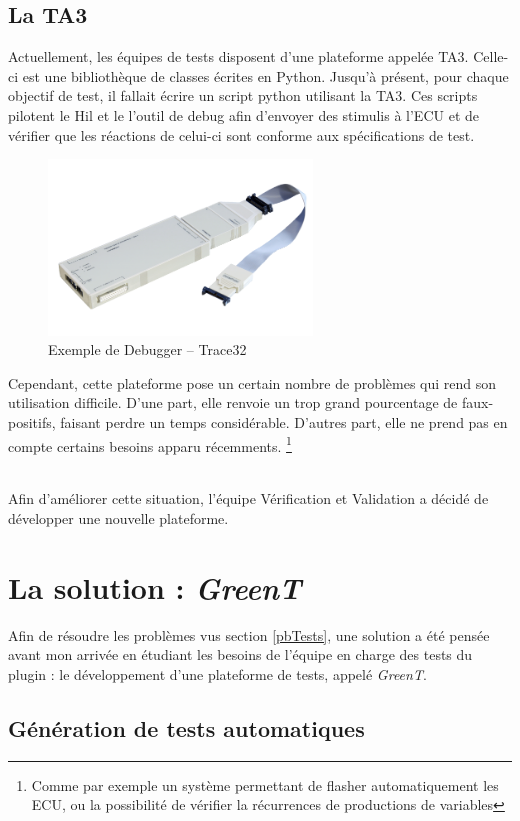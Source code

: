 	\subsection{La TA3}
	Actuellement, les équipes de tests disposent d'une plateforme appelée TA3. Celle-ci est une bibliothèque de classes écrites en Python. Jusqu'à présent, pour chaque objectif de test, il fallait écrire un script python utilisant la TA3. Ces scripts pilotent le Hil et le l'outil de debug afin d'envoyer des stimulis à l'ECU et de vérifier que les réactions de celui-ci sont conforme aux spécifications de test.
	\begin{figure}[H]		
		\centering
		\includegraphics[width=7cm]{contents/images/trace32.png}
		\caption{Exemple de Debugger -- Trace32}
		\label{fig:photoHil}
	\end{figure}

	Cependant, cette plateforme pose un certain nombre de problèmes qui rend son utilisation difficile. D'une part, elle renvoie un trop grand pourcentage de faux-positifs, faisant perdre un temps considérable. D'autres part, elle ne prend pas en compte certains besoins apparu récemments. \footnote{Comme par exemple un système permettant de flasher automatiquement les ECU, ou la possibilité de vérifier la récurrences de productions de variables}
\\~

	Afin d'améliorer cette situation, l'équipe Vérification et Validation a décidé de développer une nouvelle plateforme.

	\section{La solution : \textit{GreenT}}
	Afin de résoudre les problèmes vus section \ref{pbTests}, une solution a été pensée avant mon arrivée en étudiant les besoins de l'équipe en charge des tests du plugin : le développement d'une plateforme de tests, appelé \textit{GreenT}.

	\subsection{Génération de tests automatiques}

